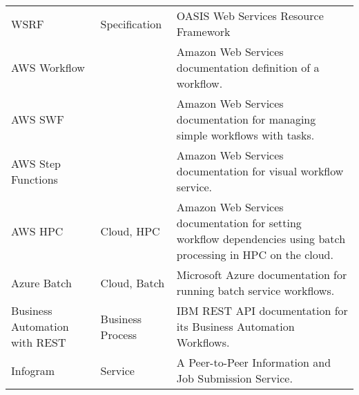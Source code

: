 \begin{table*}[htb]
{{\begin{tabular}{|p{3cm}|p{3cm}|p{10cm}|}
  WSRF \cite{www-wsrf} & Specification & OASIS Web Services Resource Framework\\

AWS Workflow \cite{www-aws-workflow} & & Amazon Web Services documentation definition of a workflow.\\
\hline

AWS SWF \cite{www-aws-swf} & & Amazon Web Services documentation for managing simple workflows with tasks. \\
\hline

AWS Step Functions \cite{www-aws-stepfunctions} & & Amazon Web Services documentation for visual workflow service. \\
\hline

AWS HPC  \cite{www-aws-batch-workflow} & Cloud, HPC & Amazon Web Services documentation for setting workflow dependencies using batch processing in HPC on the cloud. \\
\hline

Azure Batch \cite{www-azure-batch} & Cloud, Batch & Microsoft Azure documentation for running batch service workflows. \\
  \hline

 Business Automation with REST \cite{www-business-rest-ibm} & Business
                                        Process& IBM REST API documentation for its Business Automation Workflows. \\
\hline

  


Infogram \cite{las-02-infogram} & Service & A Peer-to-Peer Information and Job Submission Service.\\
\hline
\end{tabular}
}
}
\end{table*}
